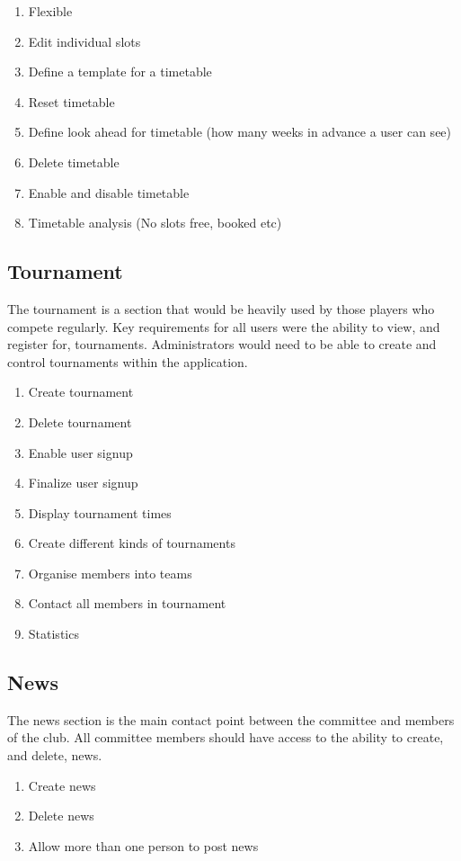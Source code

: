 \begin{enumerate}
\item Flexible 
\item Edit individual slots
\item Define a template for a timetable
\item Reset timetable
\item Define look ahead for timetable (how many weeks in advance a user can see)
\item Delete timetable
\item Enable and disable timetable
\item Timetable analysis (No slots free, booked etc)
\end{enumerate}

\subsection{Tournament}

The tournament is a section that would be heavily used by those players who compete regularly. Key requirements for all users were the ability to view, and register for, tournaments. Administrators would need to be able to create and control tournaments within the application.

\begin{enumerate}
\item Create tournament
\item Delete tournament
\item Enable user signup
\item Finalize user signup
\item Display tournament times
\item Create different kinds of tournaments
\item Organise members into teams
\item Contact all members in tournament
\item Statistics
\end{enumerate}


\subsection{News}

The news section is the main contact point between the committee and members of the club. All committee members should have access to the ability to create, and delete, news. 

\begin{enumerate}
\item Create news
\item Delete news
\item Allow more than one person to post news
\end{enumerate}

